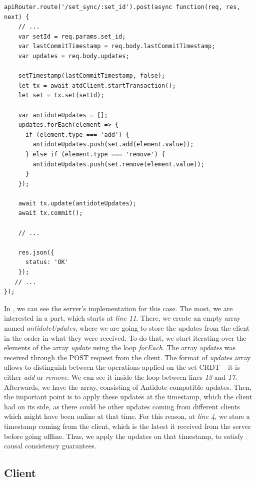 \begin{lstlisting}[caption={Code for applying an \textit{add} operation to a set CRDT.}, label={lst:dev3}]
apiRouter.route('/set_sync/:set_id').post(async function(req, res, next) {
    // ...
    var setId = req.params.set_id;
    var lastCommitTimestamp = req.body.lastCommitTimestamp;
    var updates = req.body.updates;

    setTimestamp(lastCommitTimestamp, false);
    let tx = await atdClient.startTransaction();
    let set = tx.set(setId);

    var antidoteUpdates = [];
    updates.forEach(element => {
      if (element.type === 'add') {
        antidoteUpdates.push(set.add(element.value));
      } else if (element.type === 'remove') {
        antidoteUpdates.push(set.remove(element.value));
      }
    });

    await tx.update(antidoteUpdates);
    await tx.commit();
    
    // ...

    res.json({
      status: 'OK'
    });
   // ...
});
\end{lstlisting}

In , we can see the server's implementation for this case. The most, we are interested in a part, which starts at \textit{line 11}. There, we create an empty array named \textit{antidoteUpdates}, where we are going to store the updates from the client in the order in what they were received. To do that, we start iterating over the elements of the array \textit{update} using the loop \textit{forEach}. The array \textit{updates} was received through the POST request from the client. The format of \textit{updates} array allows to distinguish between the operations applied on the set CRDT -- it is either \textit{add} or \textit{remove}. We can see it inside the loop between lines \textit{13} and \textit{17}. Afterwards, we have the array, consisting of Antidote-compatible updates. Then, the important point is to apply these updates at the timestamp, which the client had on its side, as there could be other updates coming from different clients which might have been online at that time. For this reason, at \textit{line 4}, we store a timestamp coming from the client, which is the latest it received from the server before going offline. Thus, we apply the updates on that timestamp, to satisfy causal consistency guarantees.

\subsection{Client}
\label{impl-client}

